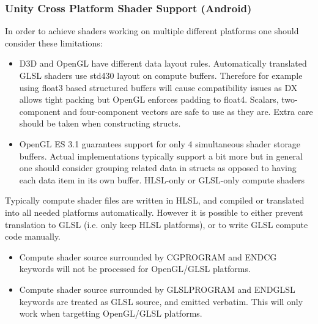 \documentclass[a4paper,10pt]{article}
\begin{document}
\subsubsection{Unity Cross Platform Shader Support (Android)}
In order to achieve shaders working on multiple different platforms one should consider these limitations:\cite{unityXP}

\begin{itemize}
\item 
D3D and OpenGL have different data layout rules. Automatically translated GLSL shaders use std430 layout on compute buffers. Therefore for example using float3 based structured buffers will cause compatibility issues as DX allows tight packing but OpenGL enforces padding to float4. Scalars, two-component and four-component vectors are safe to use as they are. Extra care should be taken when constructing structs.
\item 
OpenGL ES 3.1 guarantees support for only 4 simultaneous shader storage buffers. Actual implementations typically support a bit more but in general one should consider grouping related data in structs as opposed to having each data item in its own buffer.
HLSL-only or GLSL-only compute shaders

\end{itemize}

Typically compute shader files are written in HLSL, and compiled or translated into all needed platforms automatically. However it is possible to either prevent translation to GLSL (i.e. only keep HLSL platforms), or to write GLSL compute code manually.
\begin{itemize}
\item Compute shader source surrounded by CGPROGRAM and ENDCG keywords will not be processed for OpenGL/GLSL platforms.
\item Compute shader source surrounded by GLSLPROGRAM and ENDGLSL keywords are treated as GLSL source, and emitted verbatim. This will only work when targetting OpenGL/GLSL platforms.
\end{itemize}
\pagebreak
\end{document}
